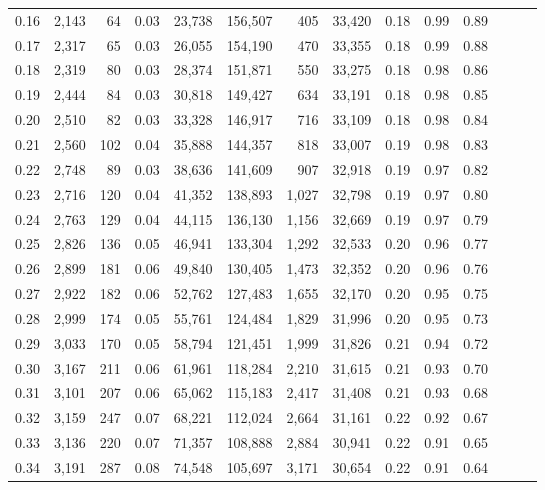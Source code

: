 \begin{tabular}{rrrrrrrrrrrrrr}
0.16 &  2,143 &   64 &  0.03 &   23,738 &  156,507 &     405 &  33,420 &  0.18 &  0.99 &      0.89 \\
0.17 &  2,317 &   65 &  0.03 &   26,055 &  154,190 &     470 &  33,355 &  0.18 &  0.99 &      0.88 \\
0.18 &  2,319 &   80 &  0.03 &   28,374 &  151,871 &     550 &  33,275 &  0.18 &  0.98 &      0.86 \\
0.19 &  2,444 &   84 &  0.03 &   30,818 &  149,427 &     634 &  33,191 &  0.18 &  0.98 &      0.85 \\
0.20 &  2,510 &   82 &  0.03 &   33,328 &  146,917 &     716 &  33,109 &  0.18 &  0.98 &      0.84 \\
0.21 &  2,560 &  102 &  0.04 &   35,888 &  144,357 &     818 &  33,007 &  0.19 &  0.98 &      0.83 \\
0.22 &  2,748 &   89 &  0.03 &   38,636 &  141,609 &     907 &  32,918 &  0.19 &  0.97 &      0.82 \\
0.23 &  2,716 &  120 &  0.04 &   41,352 &  138,893 &   1,027 &  32,798 &  0.19 &  0.97 &      0.80 \\
0.24 &  2,763 &  129 &  0.04 &   44,115 &  136,130 &   1,156 &  32,669 &  0.19 &  0.97 &      0.79 \\
0.25 &  2,826 &  136 &  0.05 &   46,941 &  133,304 &   1,292 &  32,533 &  0.20 &  0.96 &      0.77 \\
0.26 &  2,899 &  181 &  0.06 &   49,840 &  130,405 &   1,473 &  32,352 &  0.20 &  0.96 &      0.76 \\
0.27 &  2,922 &  182 &  0.06 &   52,762 &  127,483 &   1,655 &  32,170 &  0.20 &  0.95 &      0.75 \\
0.28 &  2,999 &  174 &  0.05 &   55,761 &  124,484 &   1,829 &  31,996 &  0.20 &  0.95 &      0.73 \\
0.29 &  3,033 &  170 &  0.05 &   58,794 &  121,451 &   1,999 &  31,826 &  0.21 &  0.94 &      0.72 \\
0.30 &  3,167 &  211 &  0.06 &   61,961 &  118,284 &   2,210 &  31,615 &  0.21 &  0.93 &      0.70 \\
0.31 &  3,101 &  207 &  0.06 &   65,062 &  115,183 &   2,417 &  31,408 &  0.21 &  0.93 &      0.68 \\
0.32 &  3,159 &  247 &  0.07 &   68,221 &  112,024 &   2,664 &  31,161 &  0.22 &  0.92 &      0.67 \\
0.33 &  3,136 &  220 &  0.07 &   71,357 &  108,888 &   2,884 &  30,941 &  0.22 &  0.91 &      0.65 \\
0.34 &  3,191 &  287 &  0.08 &   74,548 &  105,697 &   3,171 &  30,654 &  0.22 &  0.91 &      0.64 \\

\end{tabular}
